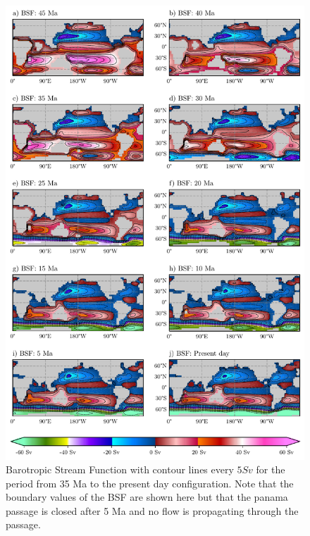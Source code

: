 \documentclass[a4paper]{article}
\begin{document}
\begin{figure}[H]
\includegraphics[width=0.95\linewidth]{BSF_2.pdf}
\caption{Barotropic Stream Function with contour lines every $5 Sv$ for the period from 35 Ma to the present day configuration. Note that the boundary values of the BSF are shown here but that the panama passage is closed after 5 Ma and no flow is propagating through the passage.}
\label{fig:bsf_total}
\end{figure}
\end{document}
